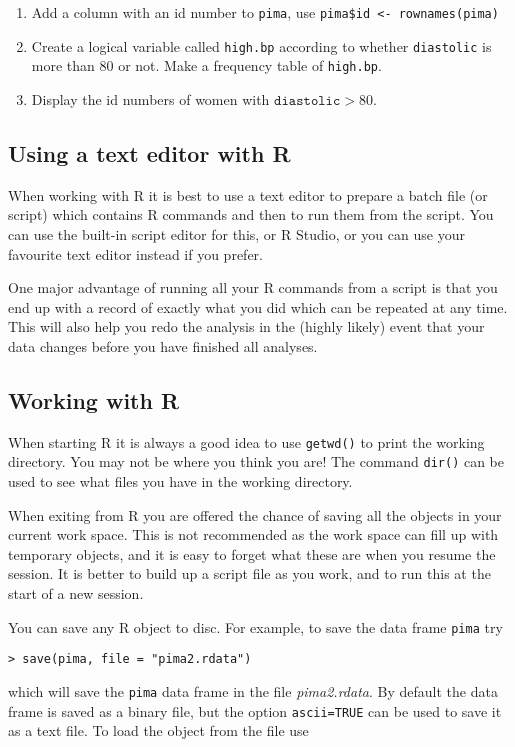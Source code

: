 \documentclass[12pt]{article}
\begin{document}
\begin{enumerate}
  \item Add a column with an id number to \texttt{pima}, use \texttt{pima\$id <- rownames(pima)}
  \item Create a logical variable called \texttt{high.bp} according to whether \texttt{diastolic} is more than 80 or not. Make a frequency table of \texttt{high.bp}.
  \item Display the id numbers of women with $\mathtt{diastolic} > 80$.
\end{enumerate}


\subsection{Using a text editor with R}
When working with R it is best to use a text editor to prepare a batch file (or script) which contains R commands and then to run them from the script. You can use the built-in script editor for this, or R Studio, or you can use your favourite text editor instead if you prefer.

One major advantage of running all your R commands from a script is that you end up with a record of exactly what you did which can be repeated at any time. This will also help you redo the analysis in the (highly likely) event that your data changes before you have finished all analyses.


\subsection{Working with R}
When starting R it is always a good idea to use \texttt{getwd()} to print the working directory. You may not be where you think you are! The command \texttt{dir()} can be used to see what files you have in
the working directory.

When exiting from R you are offered the chance of saving all the objects in your current work space. This is not recommended as the work space can fill up with temporary objects, and it is easy to forget what these are when you resume the session. It is better to build up a script file as you work, and to run this at the start of a new session.

You can save any R object to disc. For example, to save the data frame \texttt{pima} try
\begin{verbatim}
> save(pima, file = "pima2.rdata")
\end{verbatim}

which will save the \texttt{pima} data frame in the file \emph{pima2.rdata}. By default the data frame is saved as a binary file, but the option \texttt{ascii=TRUE} can be used to save it as a text file. To load the object
from the file use
\end{document}
